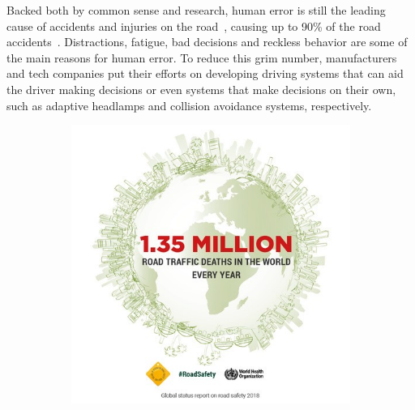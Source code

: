 Backed both by common sense and research, human error is still the leading cause of accidents and injuries on the road~\cite{Bimbraw2015, WHO2018}, causing up to 90\% of the road accidents~\cite{WHO2018}. Distractions, fatigue, bad decisions and reckless behavior are some of the main reasons for human error. To reduce this grim number, manufacturers and tech companies put their efforts on developing driving systems that can aid the driver making decisions or even systems that make decisions on their own, such as adaptive headlamps and collision avoidance systems, respectively.


\begin{figure}[H]
	\centering
	\begin{subfigure}[c]{0.3\textwidth}
		\includegraphics[width=\textwidth]{img/road_safety/1_35-million.jpg}
		\label{fig:test_image_1}
	\end{subfigure}
	\quad
	\begin{subfigure}[c]{0.3\textwidth}

\end{subfigure}
\end{figure}
